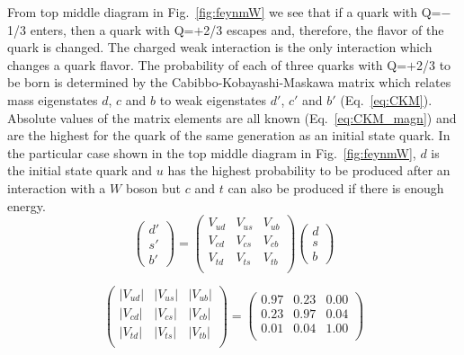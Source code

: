 From top middle diagram in Fig.~\ref{fig:feynmW} we see that if a quark with Q=$-$1/3 enters, then a quark with Q=$+$2/3 escapes and, therefore, the flavor of the quark is changed. The charged weak interaction is the only interaction which changes a quark flavor. The probability of each of three quarks with Q=$+$2/3 to be born is determined by the Cabibbo-Kobayashi-Maskawa matrix which relates mass eigenstates $d$, $c$ and $b$ to weak eigenstates $d'$, $c'$ and $b'$ (Eq.~\ref{eq:CKM}). Absolute values of the matrix elements are all known (Eq.~\ref{eq:CKM_magn}) and are the highest for the quark of the same generation as an initial state quark. In the particular case shown in the top middle diagram in Fig.~\ref{fig:feynmW}, $d$ is the initial state quark and $u$ has the highest probability to be produced after an interaction with a $W$ boson but $c$ and $t$ can also be produced if there is enough energy.\\

\begin{equation}\label{eq:CKM}
  \begin{pmatrix} d' \\ s' \\ b' \end{pmatrix}
     =
  \begin{pmatrix} 
     V_{ud} & V_{us} & V_{ub} \\
     V_{cd} & V_{cs} & V_{cb} \\
     V_{td} & V_{ts} & V_{tb} \\ 
  \end{pmatrix}
  \begin{pmatrix} d \\ s \\ b \end{pmatrix}
\end{equation}

\begin{equation}\label{eq:CKM_magn}
  \begin{pmatrix} 
     |V_{ud}| & |V_{us}| & |V_{ub}| \\
     |V_{cd}| & |V_{cs}| & |V_{cb}| \\
     |V_{td}| & |V_{ts}| & |V_{tb}| \\ 
  \end{pmatrix}
    =
  \begin{pmatrix} 
     0.97 & 0.23 & 0.00 \\
     0.23 & 0.97 & 0.04 \\
     0.01 & 0.04 & 1.00 \\ 
  \end{pmatrix}
\end{equation}

